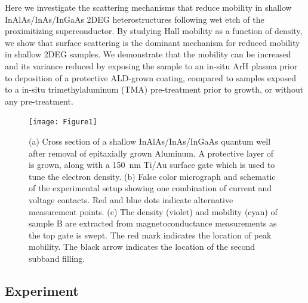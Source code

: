 Here we investigate the scattering mechanisms that reduce mobility in shallow InAlAs/InAs/InGaAs 2DEG heterostructures following wet etch of the proximitizing superconductor. By studying Hall mobility as a function of density, we show that surface scattering is the dominant mechanism for reduced mobility in shallow 2DEG samples. We demonstrate that the mobility can be increased and its variance reduced by exposing the sample to an in-situ ArH plasma prior to deposition of a protective ALD-grown  coating, compared to samples exposed to a in-situ trimethylaluminum (TMA) pre-treatment prior to  growth, or without any pre-treatment.


\begin{figure}
\texttt{[image: Figure1]}
\caption[InAs sample details and experimental setup]{\label{fig:surf_fig1} (a) Cross section of a shallow InAlAs/InAs/InGaAs quantum well after removal of epitaxially grown Aluminum. A protective layer of  is grown, along with a \SI{150}{\nano\meter} Ti/Au surface gate which is used to tune the electron density. (b) False color micrograph and schematic of the experimental setup showing one combination of current and voltage contacts. Red and blue dots indicate alternative measurement points. (c) The density (violet) and mobility (cyan) of sample B are extracted from magnetoconductance measurements as the top gate is swept. The red mark indicates the location of peak mobility. The black arrow indicates the location of the second subband filling.}
\end{figure}

\subsection{\label{sec:surf_exp}Experiment}

